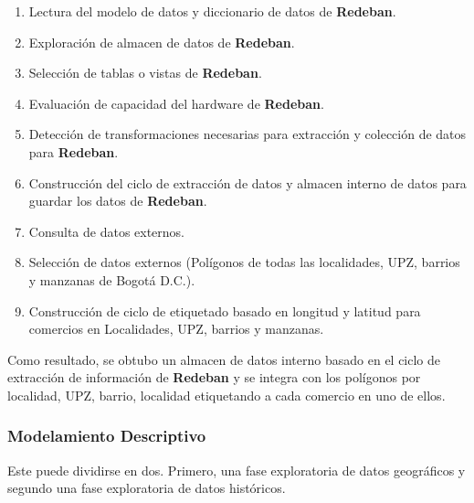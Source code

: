 \documentclass[a4paper]{article}
\begin{document}
\begin{enumerate}
	\item Lectura del modelo de datos y diccionario de datos de \textbf{Redeban}.
	\item Exploración de almacen de datos de \textbf{Redeban}.
	\item Selección de tablas o vistas de \textbf{Redeban}.
	\item Evaluación de capacidad del hardware de \textbf{Redeban}.
	\item Detección de transformaciones necesarias para extracción y colección de datos para \textbf{Redeban}.
	\item Construcción del ciclo de extracción de datos y almacen interno de datos para guardar los datos de \textbf{Redeban}.
	\item Consulta de datos externos.
	\item Selección de datos externos (Polígonos de todas las localidades, UPZ, barrios y manzanas de Bogotá D.C.).
	\item Construcción de ciclo de etiquetado basado en longitud y latitud para comercios en Localidades, UPZ, barrios y manzanas.
\end{enumerate}

Como resultado, se obtubo un almacen de datos interno basado en el ciclo de extracción de información de \textbf{Redeban} y se integra con los polígonos por localidad, UPZ, barrio, localidad etiquetando a cada comercio en uno de ellos.

\subsubsection{Modelamiento Descriptivo}

Este puede dividirse en dos. Primero, una fase exploratoria de datos geográficos y segundo una fase exploratoria de datos históricos.
\end{document}
